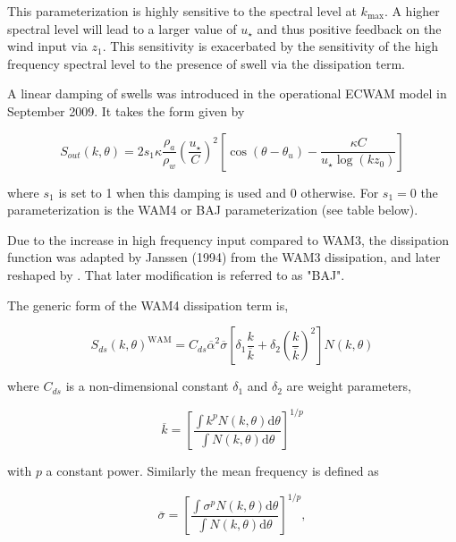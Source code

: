 \noindent
This parameterization is highly sensitive to the spectral level at $k_{\max}$.
A higher spectral level will lead to a larger value of $u_\star$ and thus
positive feedback on the wind input via $z_1$. This sensitivity is exacerbated
by the sensitivity of the high frequency spectral level to the presence of
swell via the dissipation term.

A linear damping of swells was introduced in the operational ECWAM model in September 2009. It takes 
the form given by \cite{bk:Jan04} 

\begin{equation}
S_{out}(k,\theta)= 2 s_1  \kappa \frac{\rho_a }{\rho_w} \left(\frac{u_\star}{C}\right)^2 
\left[\cos \left(\theta - \theta_u\right) - \frac{\kappa C}{u_\star \log(k z_0)}\right]
\end{equation}

\noindent where $s_1$ is set to 1 when this damping is used and 0 otherwise. For $s_1=0$ 
the parameterization is the WAM4 or BAJ parameterization (see table below). 

Due to the increase in high frequency input compared to WAM3, the dissipation
function was adapted by Janssen (1994) from the WAM3 dissipation, and later
reshaped by \cite{rep:Bea05}. That later modification is referred to as "BAJ".

\noindent
The generic form of the WAM4 dissipation term is,

\begin{equation}
S_{ds}\left(k,\theta\right)^{\mathrm{WAM}} = C_{ds} \overline{\alpha}^2
 \overline{\sigma} \left[\delta_1 \frac{k}{\overline{k}} + \delta_2
\left(\frac{k}{\overline{k}}\right)^2\right]\label{eq:SdsWAM4}
N\left(k,\theta\right)
\end{equation}

\noindent
where $C_{ds}$ is a non-dimensional constant $\delta_1$ and $\delta_2$ are
weight parameters,

\begin{equation}
\overline{k}=\left[\frac{\int k^p N\left(k,\theta\right) {\mathrm d}
\theta}{\int N\left(k,\theta\right) {\mathrm d} \theta}\right]^{1/p}
\end{equation}

\noindent
with $p$ a constant power. Similarly the mean frequency is defined as

\begin{equation}
\overline{\sigma}=\left[\frac{\int \sigma^p N\left(k,\theta\right) {\mathrm d}
\theta}{ \int N\left(k,\theta\right) {\mathrm d} \theta}\right]^{1/p},
\end{equation}

